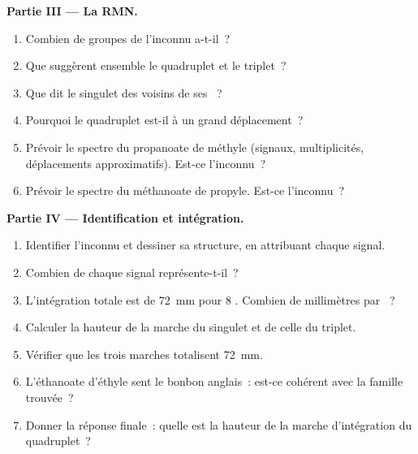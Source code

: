 \begin{problem}
\medskip
\noindent\textbf{Partie III --- La RMN.}
\begin{enumerate}[resume]
  \item Combien de groupes de  l'inconnu a-t-il~?
  \item Que suggèrent ensemble le quadruplet et le triplet~?
  \item Que dit le singulet des voisins de ses ~?
  \item Pourquoi le quadruplet est-il à un grand déplacement~?
  \item Prévoir le spectre du propanoate de méthyle
         (signaux, multiplicités, déplacements
        approximatifs). Est-ce l'inconnu~?
  \item Prévoir le spectre du méthanoate de propyle. Est-ce l'inconnu~?
\end{enumerate}

\medskip
\noindent\textbf{Partie IV --- Identification et intégration.}
\begin{enumerate}[resume]
  \item Identifier l'inconnu et dessiner sa structure, en attribuant
        chaque signal.
  \item Combien de  chaque signal représente-t-il~?
  \item L'intégration totale est de \qty{72}{mm} pour 8 . Combien
        de millimètres par ~?
  \item Calculer la hauteur de la marche du singulet et de celle du
        triplet.
  \item Vérifier que les trois marches totalisent \qty{72}{mm}.
  \item L'éthanoate d'éthyle sent le bonbon anglais~: est-ce cohérent
        avec la famille trouvée~?
  \item Donner la réponse finale~: quelle est la hauteur de la marche
        d'intégration du quadruplet~?
\end{enumerate}
\end{problem}
